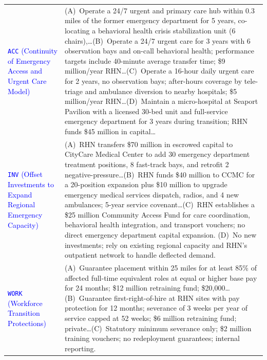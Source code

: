 \begin{table}[t]
\begin{tabularx}{\textwidth}{@{}l X@{}}
\quad \textcolor{blue}{\texttt{ACC} (Continuity of Emergency Access and Urgent Care Model)} & (A)~Operate a 24/7 urgent and primary care hub within 0.3 miles of the former emergency department for 5 years, co-locating a behavioral health crisis stabilization unit (6 chairs),\dots \newline (B)~Operate a 24/7 urgent care for 3 years with 6 observation bays and on-call behavioral health; performance targets include 40-minute average transfer time; \$9 million/year RHN\dots \newline (C)~Operate a 16-hour daily urgent care for 2 years, no observation bays; after-hours coverage by tele-triage and ambulance diversion to nearby hospitals; \$5 million/year RHN\dots \newline (D)~Maintain a micro-hospital at Seaport Pavilion with a licensed 30-bed unit and full-service emergency department for 3 years during transition; RHN funds \$45 million in capital\dots \\
\addlinespace[2pt]
\quad \textcolor{blue}{\texttt{INV} (Offset Investments to Expand Regional Emergency Capacity)} & (A)~RHN transfers \$70 million in escrowed capital to CityCare Medical Center to add 30 emergency department treatment positions, 8 fast-track bays, and retrofit 2 negative-pressure\dots \newline (B)~RHN funds \$40 million to CCMC for a 20-position expansion plus \$10 million to upgrade emergency medical services dispatch, radios, and 4 new ambulances; 5-year service covenant\dots \newline (C)~RHN establishes a \$25 million Community Access Fund for care coordination, behavioral health integration, and transport vouchers; no direct emergency department capital expansion. \newline (D)~No new investments; rely on existing regional capacity and RHN's outpatient network to handle deflected demand. \\
\addlinespace[2pt]
\quad \textcolor{blue}{\texttt{WORK} (Workforce Transition Protections)} & (A)~Guarantee placement within 25 miles for at least 85\% of affected full-time equivalent roles at equal or higher base pay for 24 months; \$12 million retraining fund; \$20,000\dots \newline (B)~Guarantee first-right-of-hire at RHN sites with pay protection for 12 months; severance of 3 weeks per year of service capped at 52 weeks; \$6 million retraining fund; private\dots \newline (C)~Statutory minimum severance only; \$2 million training vouchers; no redeployment guarantees; internal reporting. \\

\end{tabularx}
\end{table}
